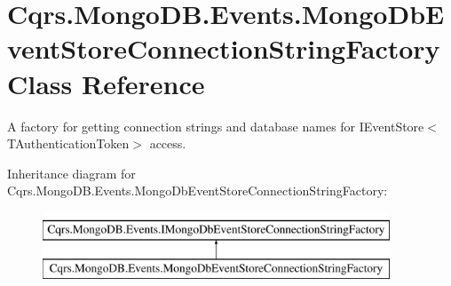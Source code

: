 \hypertarget{classCqrs_1_1MongoDB_1_1Events_1_1MongoDbEventStoreConnectionStringFactory}{}\section{Cqrs.\+Mongo\+D\+B.\+Events.\+Mongo\+Db\+Event\+Store\+Connection\+String\+Factory Class Reference}
\label{classCqrs_1_1MongoDB_1_1Events_1_1MongoDbEventStoreConnectionStringFactory}


A factory for getting connection strings and database names for I\+Event\+Store$<$\+T\+Authentication\+Token$>$ access.  


Inheritance diagram for Cqrs.\+Mongo\+D\+B.\+Events.\+Mongo\+Db\+Event\+Store\+Connection\+String\+Factory\+:\begin{figure}[H]
\begin{center}
\leavevmode
\includegraphics[height=2.000000cm]{classCqrs_1_1MongoDB_1_1Events_1_1MongoDbEventStoreConnectionStringFactory}
\end{center}
\end{figure}
